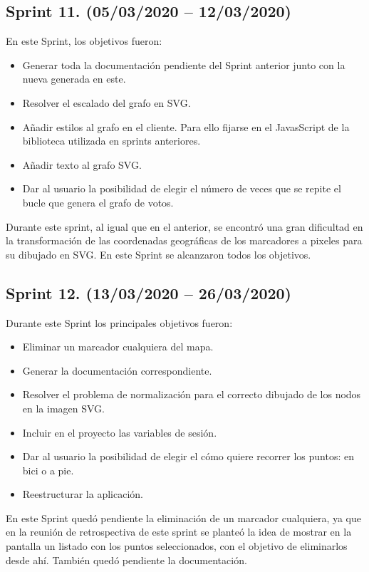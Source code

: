 \subsection{Sprint 11. (05/03/2020 -- 12/03/2020)}
En este Sprint, los objetivos fueron:
\begin{itemize}
	\item Generar toda la documentación pendiente del Sprint anterior junto con la nueva generada en este.
	\item Resolver el escalado del grafo en SVG.
	\item Añadir estilos al grafo en el cliente. Para ello fijarse en el JavasScript de la biblioteca utilizada en sprints anteriores.
	\item Añadir texto al grafo SVG.
	\item Dar al usuario la posibilidad de elegir el número de veces que se repite el bucle que genera el grafo de votos.
\end{itemize}
Durante este sprint, al igual que en el anterior, se encontró una gran dificultad en la transformación de las coordenadas geográficas de los marcadores a pixeles para su dibujado en SVG.
En este Sprint se alcanzaron todos los objetivos.

\subsection{Sprint 12. (13/03/2020 -- 26/03/2020)}
Durante este Sprint los principales objetivos fueron:
\begin{itemize}
	\item Eliminar un marcador cualquiera del mapa.
	\item Generar la documentación correspondiente.
	\item Resolver el problema de normalización para el correcto dibujado de los nodos en la imagen SVG.
	\item Incluir en el proyecto las variables de sesión.
	\item Dar al usuario la posibilidad de elegir el cómo quiere recorrer los puntos: en bici o a pie.
	\item Reestructurar la aplicación.
\end{itemize}
En este Sprint quedó pendiente la eliminación de un marcador cualquiera, ya que en la reunión de retrospectiva de este sprint se planteó la idea de mostrar en la pantalla un listado con los puntos seleccionados, con el objetivo de eliminarlos desde ahí. También quedó pendiente la documentación.

